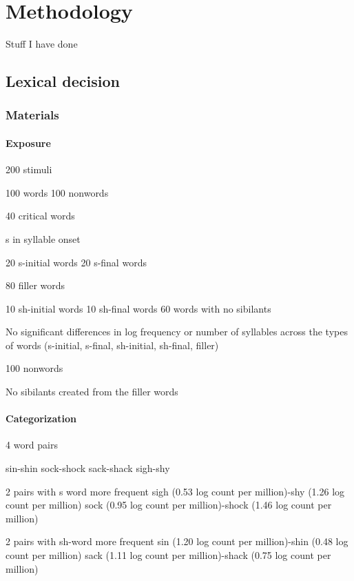 
\chapter{Methodology}

Stuff I have done



\section{Lexical decision}

\subsection{Materials}

\subsubsection{Exposure}

200 stimuli

	100 words
	100 nonwords

40 critical words

	s in syllable onset

	20 s-initial words
	20 s-final words

80 filler words

	10 sh-initial words
	10 sh-final words
	60 words with no sibilants

No significant differences in log frequency or number of syllables across the types of words (s-initial, s-final, sh-initial, sh-final, filler)

100 nonwords

	No sibilants
	created from the filler words

\subsubsection{Categorization}

4 word pairs

	sin-shin
	sock-shock
	sack-shack
	sigh-shy

2 pairs with s word more frequent
	sigh (0.53 log count per million)-shy (1.26 log count per million)
	sock (0.95 log count per million)-shock (1.46 log count per million)

2 pairs with sh-word more frequent
	sin (1.20 log count per million)-shin (0.48 log count per million)
	sack (1.11 log count per million)-shack (0.75 log count per million)
	


